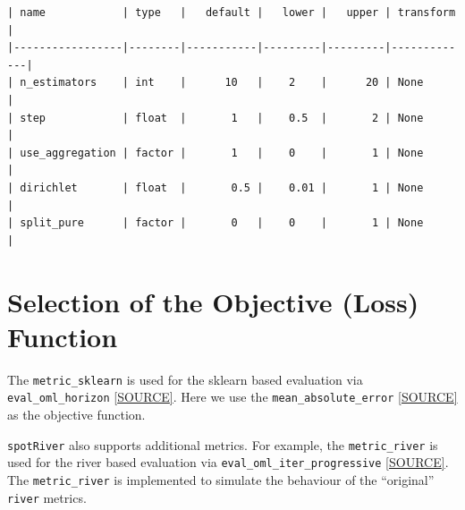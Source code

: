 \documentclass[
  letterpaper,
  DIV=11,
  numbers=noendperiod]{scrreprt}
\begin{document}
\begin{verbatim}
| name            | type   |   default |   lower |   upper | transform   |
|-----------------|--------|-----------|---------|---------|-------------|
| n_estimators    | int    |      10   |    2    |      20 | None        |
| step            | float  |       1   |    0.5  |       2 | None        |
| use_aggregation | factor |       1   |    0    |       1 | None        |
| dirichlet       | float  |       0.5 |    0.01 |       1 | None        |
| split_pure      | factor |       0   |    0    |       1 | None        |
\end{verbatim}

\hypertarget{selection-of-the-objective-loss-function-2}{%
\section{Selection of the Objective (Loss)
Function}\label{selection-of-the-objective-loss-function-2}}

The \texttt{metric\_sklearn} is used for the sklearn based evaluation
via \texttt{eval\_oml\_horizon}
\href{https://github.com/sequential-parameter-optimization/spotRiver/blob/main/src/spotRiver/evaluation/eval_bml.py}{{[}SOURCE{]}}.
Here we use the \texttt{mean\_absolute\_error}
\href{https://scikit-learn.org/stable/modules/generated/sklearn.metrics.mean_absolute_error.html}{{[}SOURCE{]}}
as the objective function.

\begin{tcolorbox}[enhanced jigsaw, rightrule=.15mm, opacityback=0, colframe=quarto-callout-note-color-frame, opacitybacktitle=0.6, toptitle=1mm, arc=.35mm, colbacktitle=quarto-callout-note-color!10!white, coltitle=black, toprule=.15mm, leftrule=.75mm, titlerule=0mm, title=\textcolor{quarto-callout-note-color}{\faInfo}\hspace{0.5em}{Note: Additional metrics}, bottomrule=.15mm, breakable, bottomtitle=1mm, left=2mm, colback=white]

\texttt{spotRiver} also supports additional metrics. For example, the
\texttt{metric\_river} is used for the river based evaluation via
\texttt{eval\_oml\_iter\_progressive}
\href{https://github.com/sequential-parameter-optimization/spotRiver/blob/main/src/spotRiver/evaluation/eval_oml.py}{{[}SOURCE{]}}.
The \texttt{metric\_river} is implemented to simulate the behaviour of
the ``original'' \texttt{river} metrics.

\end{tcolorbox}
\end{document}
